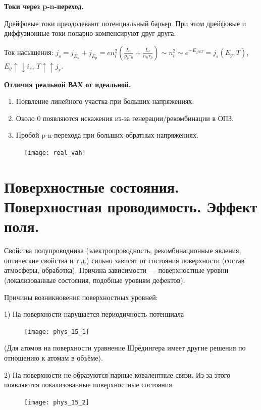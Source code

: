 \textbf{Токи через p-n-переход.}

Дрейфовые токи преодолевают потенциальный барьер. При этом дрейфовые и диффузионные токи попарно компенсируют друг друга.

Ток насыщения: $j_s=j_{E_n}+j_{E_p}=e n_i^2\left(\frac{L_n}{p_p \tau_n}+\frac{L_e}{n_n \tau_p}\right) \sim n_i^2 \sim e^{-E_{j / k T}}=j_s\left(E_g, T\right)$, $E_g \uparrow \downarrow i_s$, $T \uparrow \uparrow j_s$.


\textbf{Отличия реальной ВАХ от идеальной.}

\begin{enumerate}
    \item Появление линейного участка при больших напряжениях.
    \item Около 0 появляются искажения из-за генерации/рекомбинации в ОПЗ.
    \item Пробой p-n-перехода при больших обратных напряжениях.
\end{enumerate}


\begin{figure}[h!]
    \centering
    \texttt{[image: real\_vah]}
\end{figure}


\section{Поверхностные состояния. Поверхностная проводимость. Эффект поля.}


Свойства полупроводника (электропроводность, рекомбинационные явления, оптические свойства и т.д.) сильно зависят от состояния поверхности (состав атмосферы, обработка). Причина зависимости --- поверхностные уровни (локализованные состояния, подобные уровням дефектов).

Причины возникновения поверхностных уровней:

1) На поверхности нарушается периодичность потенциала

\begin{figure}[h!]
    \centering
    \texttt{[image: phys\_15\_1]}
\end{figure}

(Для атомов на поверхности уравнение Шрёдингера имеет другие решения по отношению к атомам в объёме).

2) На поверхности не образуются парные ковалентные связи. Из-за этого появляются локализованные поверхностные состояния.

\begin{figure}[h!]
    \centering
    \texttt{[image: phys\_15\_2]}
\end{figure}

